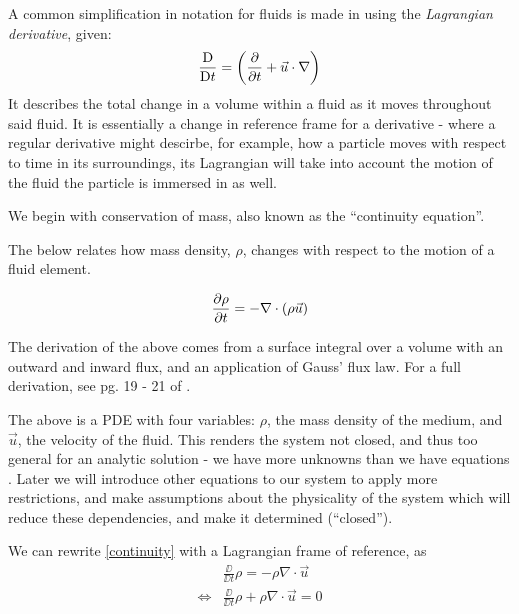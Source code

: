 \begin{notn}
    A common simplification in notation for fluids is made in using the \emph{Lagrangian derivative}, given:
    $$\frac{\text{D}}{\text{D} t} = \left (\pdv{t} + \vec{u} \cdot \nabla \right )$$ 
    It describes the total change in a volume within a fluid as it moves throughout said fluid. It is essentially 
    a change in reference frame for a derivative - where a regular derivative might descirbe, for example, 
    how a particle moves with respect to time in its surroundings, its Lagrangian will take into account 
    the motion of the fluid the particle is immersed in as well.
\end{notn}

We begin with conservation of mass, also known as the ``continuity equation''. 

\begin{definition}
    The below relates how mass density, $\rho$, changes with respect to the motion of a 
    fluid element.

    \begin{equation}
        \pdv{\rho}{t}  = -\nabla \cdot \left ( \rho \vec{u} \right ) \label{continuity}
    \end{equation}

    The derivation of the above comes from a surface integral over a volume with an outward and inward flux, 
    and an application of Gauss' flux law. For a full derivation, see pg. 19 - 21 of \cite{mhd-lectures}.
\end{definition}

\begin{remark}
    The above is a PDE with four variables: $\rho$, the mass density of the medium, and $\vec{u}$, the velocity 
    of the fluid. This renders the system not closed, and thus too general for an analytic solution - we have 
    more unknowns than we have equations \cite{mhd-lectures}. Later we 
    will introduce other equations to our system to apply more restrictions, and make assumptions about the 
    physicality of the system which will reduce these dependencies, and make it determined (``closed'').
\end{remark}

\begin{remark}
    We can rewrite \eqref{continuity} with a Lagrangian frame of reference, as 
    \begin{align}
        &\frac{\DD}{\DD t}\rho = -\rho \nabla \cdot \vec{u} \\
        \iff &\frac{\DD}{\DD t}\rho + \rho \nabla \cdot \vec{u} = 0 \label{continuity-lag}
    \end{align}
\end{remark}

